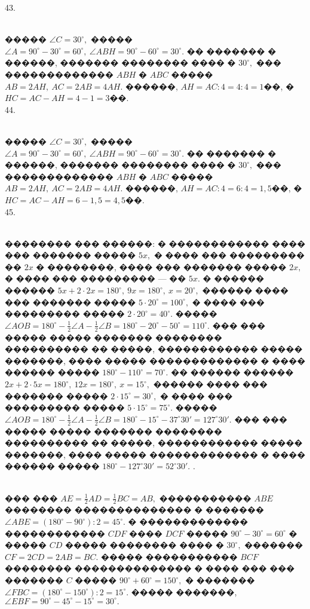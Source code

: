 \documentclass[12pt]{article}
\begin{document}
43. \begin{figure}[ht!]
\end{figure}\\
����� $\angle C=30^\circ,$ ����� $\angle A=90^\circ-30^\circ=60^\circ,\ \angle ABH=90^\circ-60^\circ=30^\circ.$ �� ������� � ������, ������� �������� ���� � $30^\circ,$ ��� ������������� $ABH$ � $ABC$ ����� $AB=2AH,\ AC=2AB=4AH.$ ������, $AH=AC:4=4:4=1$��, � $HC=AC-AH=4-1=3$��.\\
44. \begin{figure}[ht!]
\end{figure}\\
����� $\angle C=30^\circ,$ ����� $\angle A=90^\circ-30^\circ=60^\circ,\ \angle ABH=90^\circ-60^\circ=30^\circ.$ �� ������� � ������, ������� �������� ���� � $30^\circ,$ ��� ������������� $ABH$ � $ABC$ ����� $AB=2AH,\ AC=2AB=4AH.$ ������, $AH=AC:4=6:4=1,5$��, � $HC=AC-AH=6-1,5=4,5$��.\\
45. \begin{figure}[ht!]
\end{figure}\\
�������� ��� ������: � ������������ ���� ��� ������� ����� $5x,$ � ���� ��� ��������� �� $2x$ � ��������, ���� ��� ������� ����� $2x,$ � ���� ��� ��������� --- �� $5x.$ � ������ ������ $5x+2\cdot2x=180^\circ,\ 9x=180^\circ,\ x=20^\circ,$ ������ ���� ��� ������� ����� $5\cdot20^\circ=100^\circ,$ � ���� ��� ��������� ����� $2\cdot20^\circ=40^\circ.$ ����� $\angle AOB=180^\circ-\frac{1}{2}\angle A-\frac{1}{2}\angle B=180^\circ-20^\circ-50^\circ=110^\circ.$ ��� ��� ����� ����� ������� �������� ���������� �� �����, ������������ ����� �������, ���� ����� ������������� � ���� ������ ����� $180^\circ-110^\circ=70^\circ.$ �� ������ ������ $2x+2\cdot5x=180^\circ,\ 12x=180^\circ,\ x=15^\circ,$ ������ ���� ��� ������� ����� $2\cdot15^\circ=30^\circ,$ � ���� ��� ��������� ����� $5\cdot15^\circ=75^\circ.$
����� $\angle AOB=180^\circ-\frac{1}{2}\angle A-\frac{1}{2}\angle B=180^\circ-15^\circ-37^\circ30'=127^\circ30'.$ ��� ��� ����� ����� ������� �������� ���������� �� �����, ������������ ����� �������, ���� ����� ������������� � ���� ������ ����� $180^\circ-127^\circ30'=52^\circ30'.$\newpage
{}. \begin{figure}[ht!]
\end{figure}\\
��� ��� $AE=\frac{1}{2}AD=\frac{1}{2}BC=AB,$ ����������� $ABE$ �������� �������������� � ������� $\angle ABE=(180^\circ-90^\circ):2=45^\circ.$ � ������������� ������������ $CDF$ ���� $DCF$ ����� $90^\circ-30^\circ=60^\circ$ � ����� $CD$ ����� �������� ���� � $30^\circ,$ ������� $CF=2CD=2AB=BC.$ ����� ����������� $BCF$ �������� �������������� � ���� ��� ��� ������� $C$ ����� $90^\circ+60^\circ=150^\circ,$ � ������� $\angle FBC=(180^\circ-150^\circ):2=15^\circ.$ ����� �������, $\angle EBF=90^\circ-45^\circ-15^\circ=30^\circ.$\\
\end{document}
